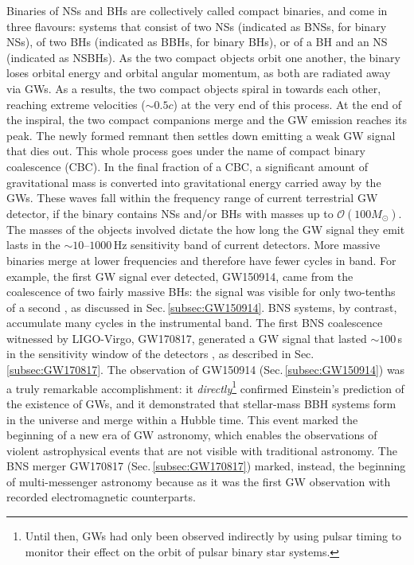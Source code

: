 \documentclass[binding=0.6cm, LaM]{sapthesis}
\begin{document}
        Binaries of NSs and BHs are collectively called compact binaries,
        and come in three flavours: systems that consist of two NSs (indicated as BNSs, for binary NSs), 
	of two BHs (indicated as BBHs, for binary BHs), or of a BH and an NS (indicated as NSBHs).
        As the two compact objects orbit one another, the binary loses orbital energy and orbital angular momentum, 
	as both are radiated away via GWs.
        As a results, the two compact objects spiral in towards each other, 
	reaching extreme velocities ($\sim 0.5c$) at the very end of this process. 
        At the end of the inspiral, the two compact companions merge and 
	the GW emission reaches its peak. 
	The newly formed remnant then settles down emitting a weak GW signal that dies out.
	This whole process goes under the name of compact binary coalescence (CBC).
	In the final fraction of a CBC, a significant amount of gravitational mass is converted 
	into gravitational energy carried away by the GWs.
	These waves fall within the frequency range of current terrestrial GW detector, 
	if the binary contains NSs and/or BHs with masses up to $\mathcal{O}(100M_\odot)$.
        The masses of the objects involved dictate the how long the GW signal they emit 
	lasts in the $\sim 10$--$1000$\,Hz sensitivity band of current detectors.
        More massive binaries merge at lower frequencies and therefore have fewer cycles in band.
        For example, the first GW signal ever detected, GW150914, came from the coalescence of two fairly massive BHs: 
	the signal was visible for only two-tenths of a second \cite{14}, as discussed in Sec.\,\ref{subsec:GW150914}. 
        BNS systems, by contrast, accumulate many cycles in the instrumental band.
        The first BNS coalescence witnessed by LIGO-Virgo, GW170817, 
	generated a GW signal that lasted $\sim 100\,$s in the sensitivity window of the detectors \cite{15}, 
	as described in Sec.\,\ref{subsec:GW170817}.
	The observation of GW150914 (Sec.\,\ref{subsec:GW150914}) was a truly remarkable accomplishment: 
	it \emph{directly}\footnote{Until then, GWs had only been observed indirectly by using pulsar timing to monitor 
        their effect on the orbit of pulsar binary star systems.} confirmed Einstein's prediction of the existence of GWs, 
	and it demonstrated that stellar-mass BBH systems form in the universe and merge within a Hubble time.
	This event marked the beginning of a new era of GW astronomy, 
	which enables the observations of violent astrophysical events that are not visible with traditional astronomy.
	The BNS merger GW170817 (Sec.\,\ref{subsec:GW170817}) marked, instead, the beginning of multi-messenger astronomy 
	because as it was the first GW observation with recorded electromagnetic counterparts.
\end{document}
